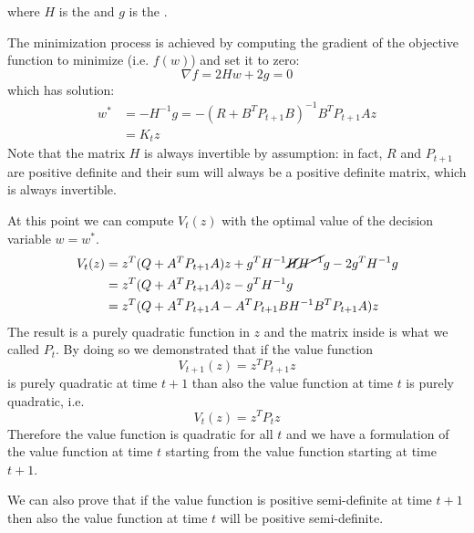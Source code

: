 where $H$ is the  and $g$ is the .

The minimization process is achieved by computing the gradient of the objective function to minimize (i.e. $f(w)$) and set it to zero:
\[\nabla f=2Hw+2g=0\]
which has solution:
\begin{align*}
w^* &= -H^{-1}g = -(R+B^TP_{t+1}B)^{-1}B^TP_{t+1}Az\\
&=K_tz
\end{align*}
Note that the matrix $H$ is always invertible by assumption: in fact, $R$ and $P_{t+1}$ are positive definite and their sum will always be a positive definite matrix, which is always invertible.

At this point we can compute $V_t(z)$ with the optimal value of the decision variable $w = w^*$.
\begin{align*}
V_t(z) &= z^T(Q+A^TP_{t+1}A)z + g^TH^{-1}\cancel{H}\cancel{H^{-1}}g -2g^TH^{-1}g\\
&=z^T(Q+A^TP_{t+1}A)z  - g^TH^{-1}g\\
&=z^T(Q + A^TP_{t+1}A - A^TP_{t+1}BH^{-1}B^TP_{t+1}A)z
\end{align*}
The result is a purely quadratic function in $z$ and the matrix inside is what we called $P_t$. By doing so we demonstrated that if the value function
\[V_{t+1}(z) = z^TP_{t+1}z\]
is purely quadratic at time $t+1$ than also the value function at time $t$ is purely quadratic, i.e.
\[V_t(z) = z^TP_tz\]
Therefore the value function is quadratic for all $t$ and we have a formulation of the value function at time $t$ starting from the value function starting at time $t+1$.

We can also prove that if the value function is positive semi-definite at time $t+1$ then also the value function at time $t$ will be positive semi-definite.

